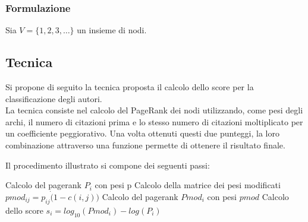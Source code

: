 \documentclass[a4paper, 12pt]{article}
\newcommand{\pagerankModificato}{Pmod}
\newcommand{\pesiPagerankModificato}{pmod}
\begin{document}
\subsubsection{Formulazione}
Sia $ V = \{ 1, 2, 3, \ldots \} $ un insieme di nodi.
\pagebreak
\subsection{Tecnica}
Si propone di seguito la tecnica proposta il calcolo dello score per la classificazione degli autori. \\
La tecnica consiste nel calcolo del PageRank dei nodi utilizzando, come pesi degli archi, il numero di citazioni prima e lo stesso numero di citazioni moltiplicato per un coefficiente peggiorativo. Una volta ottenuti questi due punteggi, la loro combinazione attraverso una funzione permette di ottenere il risultato finale.
\par
Il procedimento illustrato si compone dei seguenti passi:
\begin{algorithm}
 {
  Calcolo del pagerank $P_{i}$ con pesi p\;
}
Calcolo della matrice dei pesi modificati 
$pmod_{ij} = p_{ij} \dot (1 - c(i, j))$\;
 {
  Calcolo del pagerank $\pagerankModificato_{i}$ con pesi $\pesiPagerankModificato$\;
}
 {
  Calcolo dello score $s_i = log_{10}(\pagerankModificato_{i}) - log(P_{i})$
}
\end{algorithm}
\end{document}
